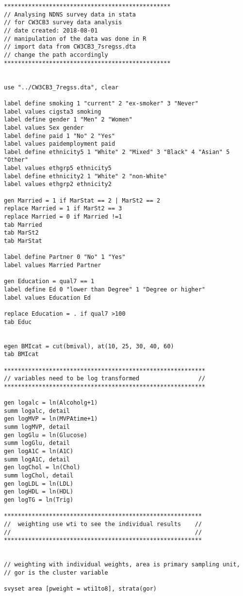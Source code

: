 \begin{verbatim}
************************************************
// Analysing NDNS survey data in stata
// for CW3CB3 survey data analysis 
// date created: 2018-08-01
// manipulation of the data was done in R
// import data from CW3CB3_7sregss.dta
// change the path accordingly
************************************************


use "../CW3CB3_7regss.dta", clear

label define smoking 1 "current" 2 "ex-smoker" 3 "Never"
label values cigsta3 smoking
label define gender 1 "Men" 2 "Women"
label values Sex gender
label define paid 1 "No" 2 "Yes"
label values paidemployment paid
label define ethnicity5 1 "White" 2 "Mixed" 3 "Black" 4 "Asian" 5 "Other"
label values ethgrp5 ethnicity5
label define ethnicity2 1 "White" 2 "non-White"
label values ethgrp2 ethnicity2

gen Married = 1 if MarStat == 2 | MarSt2 == 2 
replace Married = 1 if MarSt2 == 3
replace Married = 0 if Married !=1
tab Married
tab MarSt2
tab MarStat

label define Partner 0 "No" 1 "Yes"
label values Married Partner

gen Education = qual7 == 1
label define Ed 0 "lower than Degree" 1 "Degree or higher"
label values Education Ed

replace Education = . if qual7 >100
tab Educ


egen BMIcat = cut(bmival), at(10, 25, 30, 40, 60)
tab BMIcat

**********************************************************
// variables need to be log transformed                 //
**********************************************************

gen logalc = ln(Alcoholg+1)
summ logalc, detail
gen logMVP = ln(MVPAtime+1)
summ logMVP, detail
gen logGlu = ln(Glucose)
summ logGlu, detail
gen logA1C = ln(A1C)
summ logA1C, detail
gen logChol = ln(Chol)
summ logChol, detail
gen logLDL = ln(LDL)
gen logHDL = ln(HDL)
gen logTG = ln(Trig)

*********************************************************
//  weighting use wti to see the individual results    //
//                                                     //
*********************************************************


// weighting with individual weights, area is primary sampling unit, 
// gor is the cluster variable

svyset area [pweight = wti1to8], strata(gor)


\end{verbatim}
